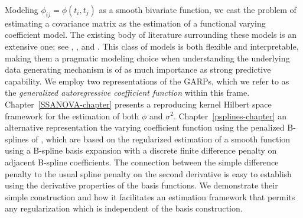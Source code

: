 %
%

Modeling $\phi_{ij} = \phi\left(t_i, t_j\right)$ as a smooth bivariate function, we cast the problem of estimating a covariance matrix as the estimation of a functional varying coefficient model. The existing body of literature surrounding these models is an extensive one; see \cite{csenturk2008generalized}, \cite{csenturk2013modeling}, and \cite{noh2010sparse}. This class of models is both flexible and interpretable, making them a pragmatic modeling choice when understanding the underlying data generating mechanism is of as much importance as strong predictive capability. We employ two representations of the GARPs, which we refer to as the \textit{generalized autoregressive coefficient function} within this frame. Chapter~\ref{SSANOVA-chapter} presents a reproducing kernel Hilbert space framework for the estimation of both $\phi$ and $\sigma^2$. Chapter~\ref{psplines-chapter} an alternative representation the varying coefficient function using the penalized B-splines of \cite{eilers1996flexible}, which are based on the regularized estimation of a smooth function using a B-spline basis expansion with a discrete finite difference penalty on adjacent B-spline coefficients. The  connection between the simple difference penalty to the usual spline penalty on the second derivative is easy to establish using the derivative properties of the basis functions. We demonstrate their simple construction and how it facilitates an estimation framework that permits any regularization which is independent of the basis construction.


